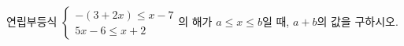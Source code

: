 연립부등식 $\begin{cases} -(3+2x)\le x-7 \\ 5x-6\le x+2 \end{cases}$의 해가 $a\le x\le b$일 때, $a+b$의 값을 구하시오.
